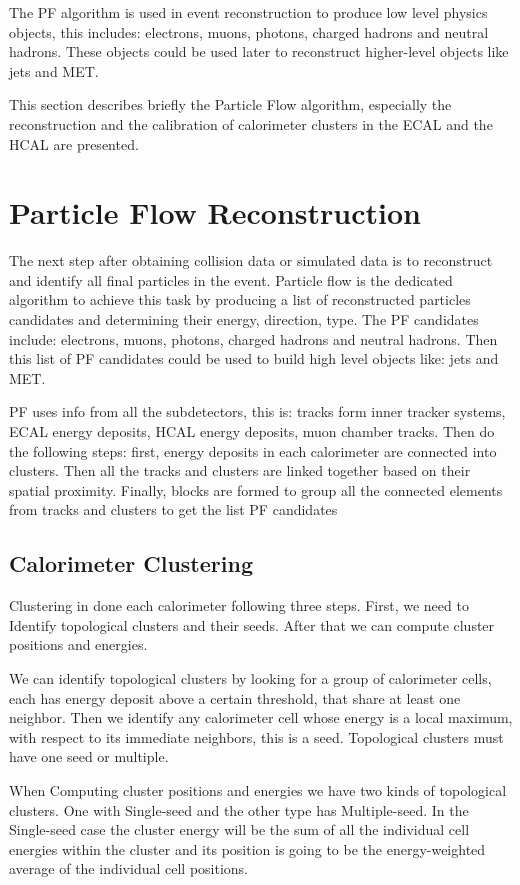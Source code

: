 The PF algorithm is used in event reconstruction to produce low level physics objects, this includes: electrons, muons, photons, charged hadrons and neutral hadrons. These objects could be used later to reconstruct higher-level objects like jets and MET.  
 
This section describes briefly the Particle Flow algorithm, especially the reconstruction and the calibration of calorimeter clusters in the ECAL and the HCAL are presented.  


\section{Particle Flow Reconstruction}

The next step after obtaining collision data or simulated data is to reconstruct and identify all final particles in the event. Particle flow is the dedicated algorithm to achieve this task by producing a list of reconstructed particles candidates and determining their energy, direction, type. The PF candidates include: electrons, muons, photons, charged hadrons and neutral hadrons. Then this list of PF candidates could be used to build high level objects like: jets and MET.  

PF uses info from all the subdetectors, this is: tracks form inner tracker systems, ECAL energy deposits, HCAL energy deposits, muon chamber tracks. Then do the following steps: first, energy deposits in each calorimeter are connected into clusters. Then all the tracks and clusters are linked together based on their spatial proximity. Finally, blocks are formed to group all the connected elements from tracks and clusters to get the list PF candidates

\subsection{Calorimeter Clustering}
Clustering in done each calorimeter following three steps. First, we need to Identify topological clusters and their seeds. After that we can compute cluster positions and energies.  

We can identify topological clusters by looking for a group of calorimeter cells, each has energy deposit above a certain threshold, that share at least one neighbor. Then we identify any calorimeter cell whose energy is a local maximum, with respect to its immediate neighbors, this is a seed. Topological clusters must have one seed or multiple. 

When Computing cluster positions and energies we have two kinds of topological clusters. One with Single-seed and the other type has Multiple-seed. In the Single-seed case the cluster energy will be the sum of all the individual cell energies within the cluster and its position is going to be the energy-weighted average of the individual cell positions. 

